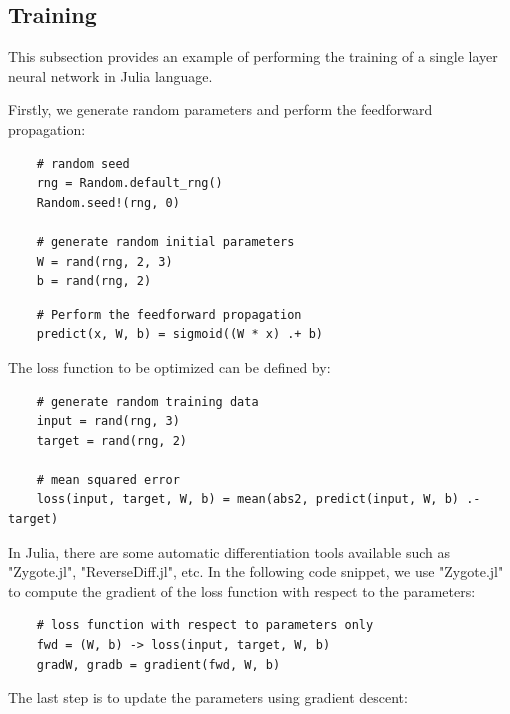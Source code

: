 \documentclass[
	parskip, 			   %
	twoside, 			   %
	DIV=14, 			   %
	BCOR=15.0mm, 		   %
	headsepline, 		   %
	open=right, 		   %
	captions=tableheading, %
	bibliography=totoc,    %
	numbers=noenddot       %
]{scrreprt}
\begin{document}
\subsection{Training}
This subsection provides an example of performing the training of a single layer neural network in Julia language.

Firstly, we generate random parameters and perform the feedforward propagation:

\begin{verbatim}
    # random seed
    rng = Random.default_rng()
    Random.seed!(rng, 0)
    
    # generate random initial parameters
    W = rand(rng, 2, 3)
    b = rand(rng, 2)
\end{verbatim}

\begin{verbatim}
    # Perform the feedforward propagation
    predict(x, W, b) = sigmoid((W * x) .+ b)
\end{verbatim}

The loss function to be optimized can be defined by:

\begin{verbatim}
    # generate random training data
    input = rand(rng, 3)
    target = rand(rng, 2)
    
    # mean squared error
    loss(input, target, W, b) = mean(abs2, predict(input, W, b) .- target)
\end{verbatim}

In Julia, there are some automatic differentiation tools available such as "Zygote.jl", "ReverseDiff.jl", etc. In the following code snippet, we use "Zygote.jl" \cite{Zygote.jl-2018} to compute the gradient of the loss function with respect to the parameters:

\begin{verbatim}
    # loss function with respect to parameters only
    fwd = (W, b) -> loss(input, target, W, b)
    gradW, gradb = gradient(fwd, W, b)
\end{verbatim}

The last step is to update the parameters using gradient descent:
\end{document}
